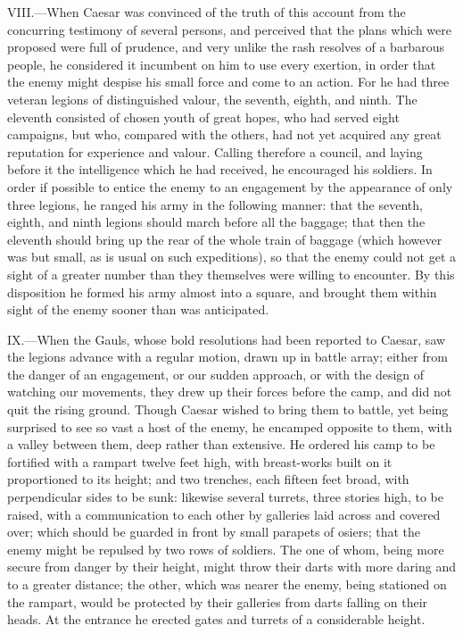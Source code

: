 VIII.—When Caesar was convinced of the truth of this account from the
concurring testimony of several persons, and perceived that the plans
which were proposed were full of prudence, and very unlike the rash
resolves of a barbarous people, he considered it incumbent on him to use
every exertion, in order that the enemy might despise his small force
and come to an action. For he had three veteran legions of distinguished
valour, the seventh, eighth, and ninth. The eleventh consisted of chosen
youth of great hopes, who had served eight campaigns, but who, compared
with the others, had not yet acquired any great reputation for
experience and valour. Calling therefore a council, and laying before it
the intelligence which he had received, he encouraged his soldiers. In
order if possible to entice the enemy to an engagement by the appearance
of only three legions, he ranged his army in the following manner: that
the seventh, eighth, and ninth legions should march before all the
baggage; that then the eleventh should bring up the rear of the whole
train of baggage (which however was but small, as is usual on such
expeditions), so that the enemy could not get a sight of a greater
number than they themselves were willing to encounter. By this
disposition he formed his army almost into a square, and brought them
within sight of the enemy sooner than was anticipated.

IX.—When the Gauls, whose bold resolutions had been reported to Caesar,
saw the legions advance with a regular motion, drawn up in battle array;
either from the danger of an engagement, or our sudden approach, or with
the design of watching our movements, they drew up their forces before
the camp, and did not quit the rising ground. Though Caesar wished to
bring them to battle, yet being surprised to see so vast a host of the
enemy, he encamped opposite to them, with a valley between them, deep
rather than extensive. He ordered his camp to be fortified with a
rampart twelve feet high, with breast-works built on it proportioned to
its height; and two trenches, each fifteen feet broad, with
perpendicular sides to be sunk: likewise several turrets, three stories
high, to be raised, with a communication to each other by galleries laid
across and covered over; which should be guarded in front by small
parapets of osiers; that the enemy might be repulsed by two rows of
soldiers. The one of whom, being more secure from danger by their
height, might throw their darts with more daring and to a greater
distance; the other, which was nearer the enemy, being stationed on the
rampart, would be protected by their galleries from darts falling on
their heads. At the entrance he erected gates and turrets of a
considerable height.

